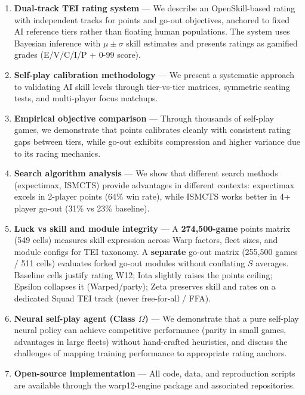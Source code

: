 \documentclass[11pt,letterpaper]{article}
\begin{document}
\begin{enumerate}
\item \textbf{Dual-track TEI rating system} --- We describe an OpenSkill-based rating with independent tracks for points and go-out objectives, anchored to fixed AI reference tiers rather than floating human populations. The system uses Bayesian inference with $\mu \pm \sigma$ skill estimates and presents ratings as gamified grades (E/V/C/I/P + 0-99 score).

\item \textbf{Self-play calibration methodology} --- We present a systematic approach to validating AI skill levels through tier-vs-tier matrices, symmetric seating tests, and multi-player focus matchups.

\item \textbf{Empirical objective comparison} --- Through thousands of self-play games, we demonstrate that points calibrates cleanly with consistent rating gaps between tiers, while go-out exhibits compression and higher variance due to its racing mechanics.

\item \textbf{Search algorithm analysis} --- We show that different search methods (expectimax, ISMCTS) provide advantages in different contexts: expectimax excels in 2-player points (64\% win rate), while ISMCTS works better in 4+ player go-out (31\% vs 23\% baseline).

\item \textbf{Luck vs skill and module integrity} --- A \textbf{274{,}500-game} points matrix (549 cells) measures skill expression across Warp factors, fleet sizes, and module configs for TEI taxonomy. A \textbf{separate} go-out matrix (255{,}500 games / 511 cells) evaluates forked go-out modules without conflating $S$ averages. Baseline cells justify rating W12; Iota slightly raises the points ceiling; Epsilon collapses it (Warped/party); Zeta preserves skill and rates on a dedicated Squad TEI track (never free-for-all / FFA).

\item \textbf{Neural self-play agent (Class $\Omega$)} --- We demonstrate that a pure self-play neural policy can achieve competitive performance (parity in small games, advantages in large fleets) without hand-crafted heuristics, and discuss the challenges of mapping training performance to appropriate rating anchors.

\item \textbf{Open-source implementation} --- All code, data, and reproduction scripts are available through the warp12-engine package and associated repositories.
\end{enumerate}
\end{document}
